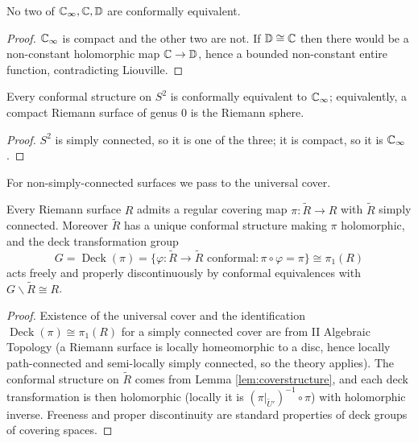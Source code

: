 \documentclass[a4paper]{scrartcl}
\newcommand{\Cinf}{\C_\infty}
\newcommand{\disc}{\mathbb{D}}
\newcommand{\Deck}{\operatorname{Deck}}
\begin{document}
\begin{proposition}
	No two of $\Cinf, \C, \disc$ are conformally equivalent.
\end{proposition}

\begin{proof}
	$\Cinf$ is compact and the other two are not. If $\disc \cong \C$ then there would be a
	non-constant holomorphic map $\C\to\disc$, hence a bounded non-constant entire function,
	contradicting Liouville.
\end{proof}

\begin{corollary}\label{cor:genus0}
	Every conformal structure on $S^2$ is conformally equivalent to $\Cinf$; equivalently,
	a compact Riemann surface of genus $0$ is the Riemann sphere.
\end{corollary}

\begin{proof}
	$S^2$ is simply connected, so it is one of the three; it is compact, so it is $\Cinf$.
\end{proof}

For non-simply-connected surfaces we pass to the universal cover.

\begin{theorem}\label{thm:universalcover}
	Every Riemann surface $R$ admits a regular covering map $\pi : \tilde R \to R$ with
	$\tilde R$ simply connected. Moreover $\tilde R$ has a unique conformal structure making
	$\pi$ holomorphic, and the deck transformation group
	$$
	G = \Deck(\pi) = \{\varphi : \tilde R \to \tilde R \text{ conformal} : \pi\circ\varphi = \pi\} \cong \pi_1(R)
	$$
	acts freely and properly discontinuously by conformal equivalences with
	$G\backslash \tilde R \cong R$.
\end{theorem}

\begin{proof}
	Existence of the universal cover and the identification $\Deck(\pi)\cong\pi_1(R)$ for a
	simply connected cover are from II Algebraic Topology (a Riemann surface is locally
	homeomorphic to a disc, hence locally path-connected and semi-locally simply connected,
	so the theory applies). The conformal structure on $\tilde R$ comes from Lemma
	\ref{lem:coverstructure}, and each deck transformation is then holomorphic (locally it
	is $(\pi|_{\tilde U'})^{-1}\circ\pi$) with holomorphic inverse. Freeness and proper
	discontinuity are standard properties of deck groups of covering spaces.
\end{proof}
\end{document}
